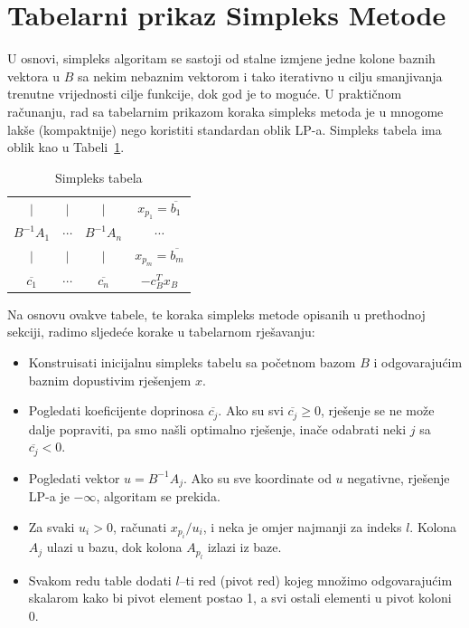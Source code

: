 \documentclass[a4paper, utf8, 11pt, colorlinks]{book}
\begin{document}
\section{Tabelarni prikaz Simpleks Metode}

U osnovi, simpleks algoritam se sastoji od stalne izmjene jedne kolone baznih vektora u $B$ sa nekim nebaznim vektorom i tako iterativno u cilju smanjivanja trenutne vrijednosti cilje funkcije, dok god je to moguće. 
U praktičnom računanju, rad sa tabelarnim prikazom koraka simpleks metoda je u mnogome lakše (kompaktnije) nego koristiti standardan oblik LP-a. 
Simpleks tabela ima oblik kao u Tabeli~\ref{tab:simplex_tabelau}. 

\begin{table}[!ht]
    \centering
    \begin{tabular}{c c c | c} \\ \hline
            $\mid$          &       $\mid$ &  $\mid$             &    $x_{p_1} = \overline{b_1}$         \\
          $B^{-1}A_1$       &    $\cdots$    &  $B^{-1}A_n$      &    $\cdots$          \\
            $\mid$          &       $\mid$ &  $\mid$             &   $ x_{p_m} = \overline{b_m}$         \\ \hline
          $\overline{c_1}$  &    $\cdots$    & $\overline{c_n}$  &  $-c^T_B x_B$         \\ \hline
    \end{tabular}
    \caption{Simpleks tabela}
    \label{tab:simplex_tabelau}
\end{table}

Na osnovu ovakve tabele, te koraka simpleks metode opisanih u prethodnoj sekciji, radimo sljedeće korake u tabelarnom rješavanju:
\begin{itemize}
    \item Konstruisati inicijalnu simpleks tabelu sa početnom bazom $B$ i odgovarajućim baznim dopustivim rješenjem $x$.
    \item Pogledati koeficijente doprinosa $\overline{c_j}$. Ako su svi $\overline{c_j} \geq 0$, rješenje se ne može dalje popraviti, pa smo našli optimalno rješenje, inače odabrati neki $j$ sa $\overline{c_j}<0$.
    \item Pogledati vektor $u = B^{-1}A_j$. Ako su sve koordinate od $u$ negativne, rješenje LP-a je $-\infty$, algoritam se prekida.
    \item Za svaki $u_i > 0$, računati $x_{p_i}/u_i$, i neka je   omjer najmanji za indeks $l$. Kolona $A_{j}$ ulazi u bazu, dok kolona $A_{p_l}$ izlazi iz baze. 
    \item Svakom redu table dodati $l$--ti red (pivot red) kojeg množimo odgovarajućim
         skalarom kako bi pivot element postao 1, a svi ostali elementi u pivot koloni 0.
\end{itemize}
\end{document}
